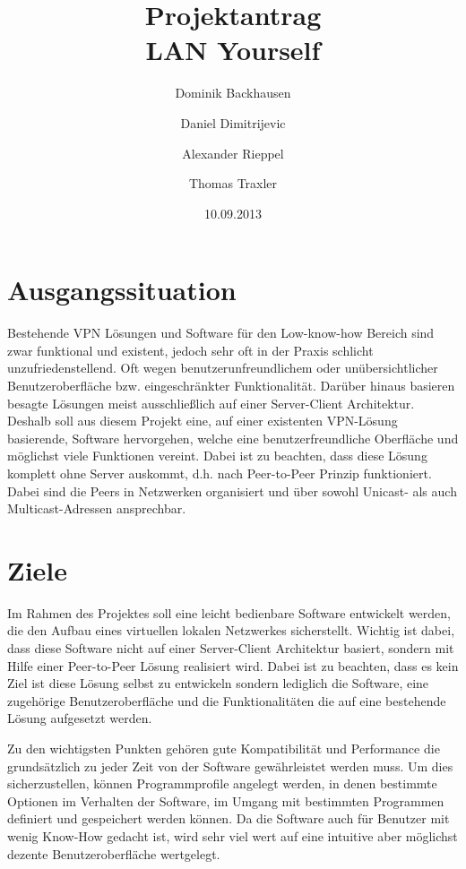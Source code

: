 \documentclass[a4paper,12pt]{scrreprt}
\begin{document}
\author{Dominik Backhausen\and Daniel Dimitrijevic\and Alexander Rieppel\and Thomas Traxler}
\title{Projektantrag\\ LAN Yourself}
\date{10.09.2013}
\maketitle

\section*{Ausgangssituation}
Bestehende VPN Lösungen und Software für den Low-know-how Bereich sind zwar funktional und existent, jedoch sehr oft in der Praxis schlicht unzufriedenstellend. Oft wegen benutzerunfreundlichem oder unübersichtlicher Benutzeroberfläche bzw. eingeschränkter Funktionalität. Darüber hinaus basieren besagte Lösungen meist ausschließlich auf einer Server-Client Architektur. Deshalb soll aus diesem Projekt eine, auf einer existenten VPN-Lösung basierende, Software hervorgehen, welche eine benutzerfreundliche Oberfläche und möglichst viele Funktionen vereint. Dabei ist zu beachten, dass diese Lösung komplett ohne Server auskommt, d.h. nach Peer-to-Peer Prinzip funktioniert. Dabei sind die Peers in Netzwerken organisiert und über sowohl Unicast- als auch Multicast-Adressen ansprechbar.



\section*{Ziele}

	Im Rahmen des Projektes soll eine leicht bedienbare Software entwickelt werden, die den Aufbau eines virtuellen lokalen Netzwerkes sicherstellt. Wichtig ist dabei, dass diese Software nicht auf einer Server-Client Architektur basiert, sondern mit Hilfe einer Peer-to-Peer Lösung realisiert wird. Dabei ist zu beachten, dass es kein Ziel ist diese Lösung selbst zu entwickeln sondern lediglich die Software, eine zugehörige Benutzeroberfläche und die Funktionalitäten die auf eine bestehende Lösung aufgesetzt werden.
	
	Zu den wichtigsten Punkten gehören gute Kompatibilität und Performance die grundsätzlich zu jeder Zeit von der Software gewährleistet werden muss. Um dies sicherzustellen, können Programmprofile angelegt werden, in denen bestimmte Optionen im Verhalten der Software, im Umgang mit bestimmten Programmen definiert und gespeichert werden können. Da die Software auch für Benutzer mit wenig Know-How gedacht ist, wird sehr viel wert auf eine intuitive aber möglichst dezente Benutzeroberfläche wertgelegt. 
	
\end{document}
